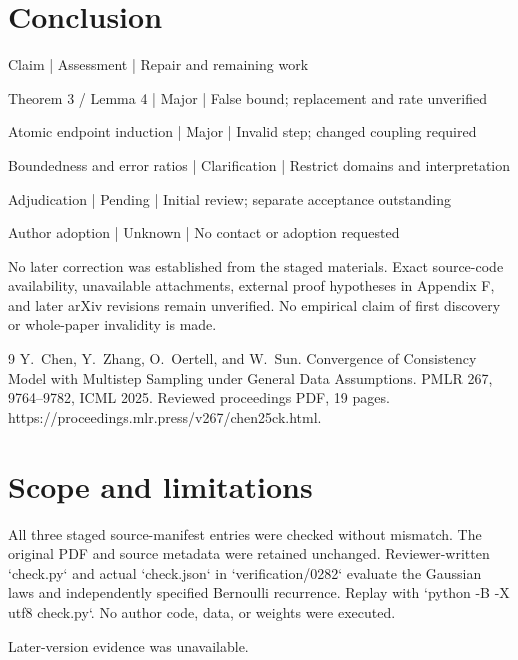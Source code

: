 \documentclass[10pt]{article}
\begin{document}
\section*{Conclusion}
Claim | Assessment | Repair and remaining work\par
Theorem 3 / Lemma 4 | Major | False bound; replacement and rate unverified\par
Atomic endpoint induction | Major | Invalid step; changed coupling required\par
Boundedness and error ratios | Clarification | Restrict domains and interpretation\par
Adjudication | Pending | Initial review; separate acceptance outstanding\par
Author adoption | Unknown | No contact or adoption requested\par
No later correction was established from the staged materials. Exact source-code availability, unavailable attachments, external proof hypotheses in Appendix F, and later arXiv revisions remain unverified. No empirical claim of first discovery or whole-paper invalidity is made.\par
9 Y. Chen, Y. Zhang, O. Oertell, and W. Sun. Convergence of Consistency Model with Multistep Sampling under General Data Assumptions. PMLR 267, 9764–9782, ICML 2025. Reviewed proceedings PDF, 19 pages. https://proceedings.mlr.press/v267/chen25ck.html.\par
\section*{Scope and limitations}
All three staged source-manifest entries were checked without mismatch. The original PDF and source metadata were retained unchanged. Reviewer-written `check.py` and actual `check.json` in `verification/0282` evaluate the Gaussian laws and independently specified Bernoulli recurrence. Replay with `python -B -X utf8 check.py`. No author code, data, or weights were executed.\par
Later-version evidence was unavailable.\par
\end{document}
